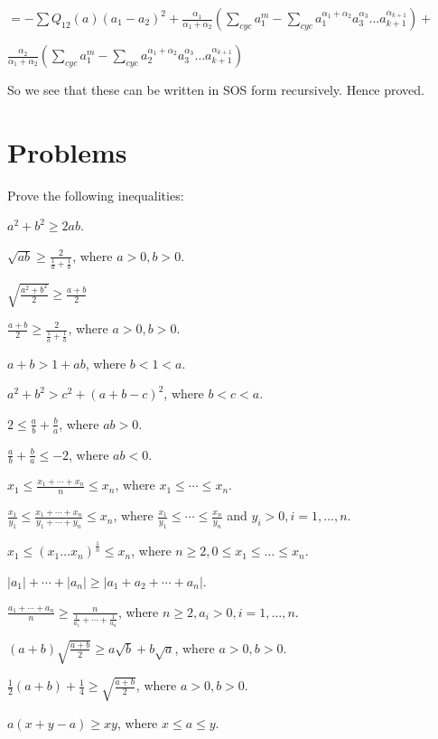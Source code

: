   $= -\sum Q_{12}(a)(a_1 - a_2)^2 + \frac{\alpha_1}{\alpha_1 + \alpha_2}\left(\sum_{cyc} a_1^m - \sum_{cyc}a_1^{\alpha_1 +
    \alpha_2}a_3^{\alpha_3}\ldots a_{k+1}^{\alpha_{k+1}}\right) + $

  $\frac{\alpha_2}{\alpha_1 + \alpha_2}\left(\sum_{cyc} a_1^m - \sum_{cyc}a_2^{\alpha_1 + \alpha_2}a_3^{\alpha_3}\ldots a_{k+1}^{\alpha_{k+1}}\right)$

  So we see that these can be written in SOS form recursively. Hence proved.
\stopproof
\pagebreak
\section{Problems}
Prove the following inequalities:

\startitemize[n, 1*broad]
\item $a^2 + b^2 \geq 2ab$.
\item $\sqrt{ab}\geq \frac{2}{\frac{1}{a} + \frac{1}{b}}$, where $a>0, b>0$.
\item $\sqrt{\frac{a^2 + b^2}{2}}\geq \frac{a + b}{2}$
\item $\frac{a + b}{2}\geq \frac{2}{\frac{1}{a} + \frac{1}{b}}$, where $a>0, b>0$.
\item $a + b > 1 + ab$, where $b < 1 < a$.
\item $a^2 + b^2 > c^2 + (a + b - c)^2$, where $b < c< a$.
\item $2\leq \frac{a}{b} + \frac{b}{a}$, where $ab > 0$.
\item $\frac{a}{b} + \frac{b}{a}\leq -2$, where $ab < 0$.
\item $x_1\leq \frac{x_1 + \cdots + x_n}{n}\leq x_n$, where $x_1\leq \cdots\leq x_n$.
\item $\frac{x_1}{y_1}\leq \frac{x_1 + \cdots + x_n}{y_1 + \cdots + y_n}\leq x_n$, where $\frac{x_1}{y_1}\leq\cdots\leq
  \frac{x_n}{y_n}$ and $y_i> 0, i=1, \ldots, n$.
\item $x_1\leq(x_1\ldots x_n)^{\tfrac{1}{n}}\leq x_n$, where $n\geq 2, 0\leq x_1\leq\ldots\leq x_n$.
\item $|a_1| + \cdots + |a_n|\geq |a_1 + a_2 + \cdots + a_n|$.
\item $\frac{a_1 + \cdots + a_n}{n}\geq \frac{n}{\frac{1}{a_1} + \cdots + \frac{1}{a_n}}$, where $n\geq 2, a_i> 0, i=1, \ldots, n$.
\item $(a + b)\sqrt{\frac{a + b}{2}} \geq a\sqrt{b} + b\sqrt{a}$, where $a > 0, b > 0$.
\item $\frac{1}{2}(a + b) + \frac{1}{4}\geq \sqrt{\frac{a + b}{2}}$, where $a > 0, b > 0$.
\item $a(x + y - a)\geq xy$, where $x\leq a\leq y$.
